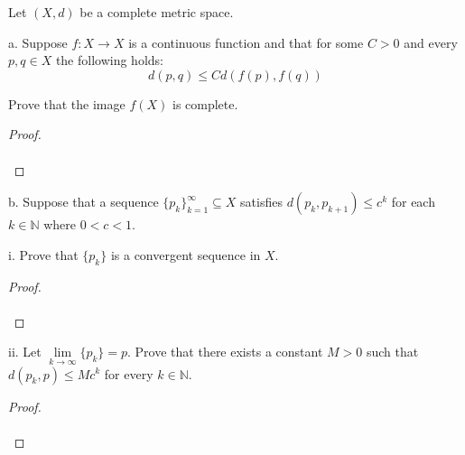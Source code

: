 Let $(X, d)$ be a complete metric space.

a.  Suppose $f:X \to X$ is a continuous function and that for some $C > 0$ and every $p, q \in X$ the following holds:
    \begin{equation*}
        d(p, q) \le C d(f(p), f(q))
    \end{equation*}

    Prove that the image $f(X)$ is complete.

\begin{proof}\renewcommand{\qedsymbol}{}\ \\\\
\end{proof}

\pagebreak

b. Suppose that a sequence $\{p_k\}_{k=1}^{\infty} \subseteq X$ satisfies $d(p_k, p_{k+1}) \le c^k$ for each 
   $k \in \mathbb{N}$ where $0 < c < 1$.

   i. Prove that $\{p_k\}$ is a convergent sequence in $X$.

   \begin{proof}\renewcommand{\qedsymbol}{}\ \\\\
   \end{proof}

   \pagebreak

   ii. Let $\lim\limits_{k \to \infty}{\{p_k\}} = p$. Prove that there exists a constant $M > 0$ such that \linebreak
       $d(p_k, p) \le M c^k$ for every $k \in \mathbb{N}$.

   \begin{proof}\renewcommand{\qedsymbol}{}\ \\\\
   \end{proof}